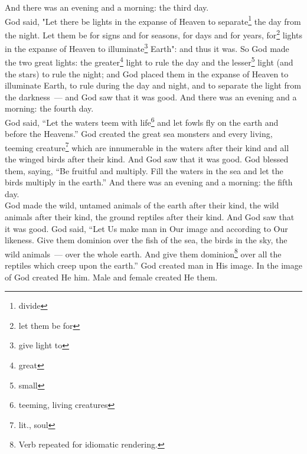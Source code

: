 \begin{enumerate*}[mode=unboxed]
     And there was an evening and a morning: the third day.\\%
     God said, "Let there be lights in the expanse of Heaven to separate\footnote{divide} the day from the night. Let them be for signs and for seasons, for days and for years,%
     for\footnote{let them be for} lights in the expanse of Heaven to illuminate\footnote{give light to} Earth": and thus it was.%
     So God made the two great lights: the greater\footnote{great} light to rule the day and the lesser\footnote{small} light (and the stars) to rule the night;%
     and God placed them in the expanse of Heaven to illuminate Earth,%
     to rule during the day and night, and to separate the light from the darkness~--- and God saw that it was good.%
     And there was an evening and a morning: the fourth day.\\%
     God said, ``Let the waters teem with life\footnote{teeming, living creatures} and let fowls fly on the earth and before the Heavens.''%
     God created the great sea monsters and every living, teeming creature\footnote{lit., soul} which are innumerable in the waters after their kind and all the winged birds after their kind. And God saw that it was good.%
     God blessed them, saying, ``Be fruitful and multiply. Fill the waters in the sea and let the birds multiply in the earth.''%
     And there was an evening and a morning: the fifth day.\\%
     God made the wild, untamed animals of the earth after their kind, the wild animals after their kind, the ground reptiles after their kind. And God saw that it was good.%
     God said, ``Let Us make man in Our image and according to Our likeness. Give them dominion over the fish of the sea, the birds in the sky, the wild animals~--- over the whole earth. And give them dominion\footnote{Verb repeated for idiomatic rendering.} over all the reptiles which creep upon the earth.''%
     God created man in His image. In the image of God created He him. Male and female created He them.%

\end{enumerate*}
